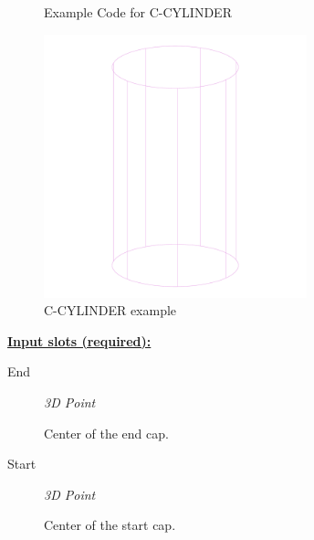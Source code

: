 \documentclass [11pt]{book}
\begin{document}
\begin{itemize}
\begin{figure}
\begin{lrbox}{\boxedverb}
\begin{minipage}{\linewidth}
{\begin{verbatim}
\end{verbatim}}
\end{minipage}
\end{lrbox}
\fbox{\usebox{\boxedverb}}

\caption{Example Code for C-CYLINDER}

\label{fig:example-code-C-CYLINDER}

\end{figure}

\begin{figure}
\begin{center}
\includegraphics[width=3in,height=3in]{../images/example-C-CYLINDER.pdf}
\end{center}

\caption{C-CYLINDER example}

\label{fig:C-CYLINDER}

\end{figure}





\textbf{
\underline{Input slots (required):}}

\begin{description}

\item [End]
\emph{3D Point}

 Center of the end cap.




\item [Start]
\emph{3D Point}

 Center of the start cap.




\end{description}







\end{itemize}
\end{document}
